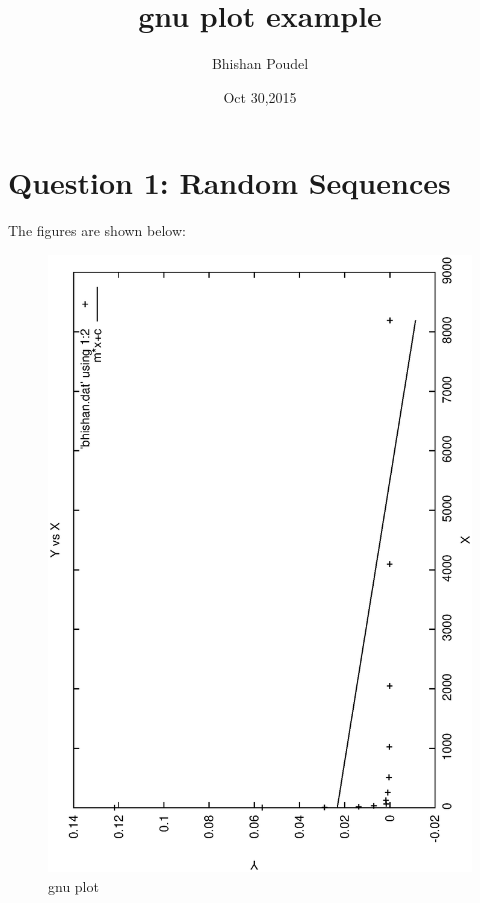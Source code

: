 \documentclass[11pt,a4paper,english]{article}
\title{gnu plot example}
\author{Bhishan Poudel}
\date{Oct 30,2015}
\begin{document}
\maketitle
\tableofcontents
\listoffigures
\clearpage


\section{Question 1: Random Sequences }

    
    	
	    The figures are shown below:\\
	\begin{figure}[h!]
	\centering
	\includegraphics [scale=0.6,angle=270] {bhishan.eps}
	\caption{gnu plot }
	\end{figure}
	\clearpage
\end{document}
